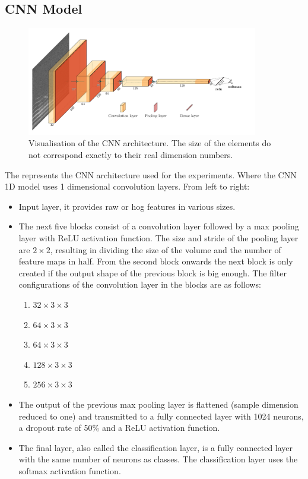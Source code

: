 \subsection{CNN Model}
\begin{figure}[ht!]
\centering
  \includegraphics[width=0.9\textwidth]{image/model/ml_model_cnn.pdf}\hfill
  \caption{Visualisation of the CNN architecture. The size of the elements do not correspond exactly to their real dimension numbers.}
  \label{fig:ml_model_cnn}
\end{figure}

The  represents the CNN architecture used for the experiments. Where the CNN 1D model uses 1 dimensional convolution layers. From left to right:
\begin{itemize}
\item Input layer, it provides raw or \gls{hog} features in various sizes. %
\item The next five blocks consist of a convolution layer followed by a max pooling layer with ReLU activation function.
The size and stride of the pooling layer are $2\times2$, resulting in dividing the size of the volume and the number of feature maps in half.
From the second block onwards the next block is only created if the output shape of the previous block is big enough.
The filter configurations of the convolution layer in the blocks are as follows:
    \begin{enumerate}
    \item $32\times3\times3$
    \item $64\times3\times3$
    \item $64\times3\times3$
    \item $128\times3\times3$
    \item $256\times3\times3$
    \end{enumerate}
\item The output of the previous max pooling layer is flattened (sample dimension reduced to one) and transmitted to a fully connected layer with 1024 neurons, a dropout rate of 50\% and a ReLU activation function.
\item The final layer, also called the classification layer, is a fully connected layer with the same number of neurons as classes. The classification layer uses the softmax activation function.
\end{itemize}

